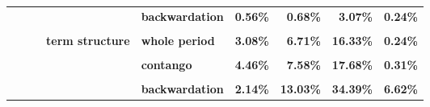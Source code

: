 \documentclass[
  authoryear,
  preprint,
  3p]{elsarticle}
\begin{document}
\begin{landscape}
\begin{longtable}[t]{>{}l>{}l>{}l>{}l>{}l>{}r>{}r>{}r>{}r}
\textbf{} & \textbf{} & \textbf{} & \textbf{} & \textbf{backwardation} & \textcolor[HTML]{4285f4}{\textbf{0.56\%}} & \textcolor[HTML]{4285f4}{\textbf{0.68\%}} & \textcolor[HTML]{4285f4}{\textbf{3.07\%}} & \textcolor[HTML]{4285f4}{\textbf{0.24\%}}\\
\addlinespace
\textbf{\cellcolor{gray!10}{}} & \textbf{\cellcolor{gray!10}{}} & \textbf{\cellcolor{gray!10}{}} & \textbf{\cellcolor{gray!10}{}} & \textbf{\cellcolor{gray!10}{contango}} & \textcolor[HTML]{4285f4}{\textbf{\cellcolor{gray!10}{0.71\%}}} & \textcolor[HTML]{4285f4}{\textbf{\cellcolor{gray!10}{1.15\%}}} & \textcolor[HTML]{4285f4}{\textbf{\cellcolor{gray!10}{4.53\%}}} & \textcolor[HTML]{4285f4}{\textbf{\cellcolor{gray!10}{0.21\%}}}\\
\textbf{} & \textbf{} & \textbf{} & \textbf{term structure} & \textbf{whole period} & \textcolor[HTML]{4285f4}{\textbf{3.08\%}} & \textcolor[HTML]{4285f4}{\textbf{6.71\%}} & \textcolor[HTML]{4285f4}{\textbf{16.33\%}} & \textcolor[HTML]{4285f4}{\textbf{0.24\%}}\\
\textbf{\cellcolor{gray!10}{}} & \textbf{\cellcolor{gray!10}{}} & \textbf{\cellcolor{gray!10}{}} & \textbf{\cellcolor{gray!10}{}} & \textbf{\cellcolor{gray!10}{backwardation}} & \textcolor[HTML]{4285f4}{\textbf{\cellcolor{gray!10}{1.79\%}}} & \textcolor[HTML]{4285f4}{\textbf{\cellcolor{gray!10}{6.21\%}}} & \textcolor[HTML]{4285f4}{\textbf{\cellcolor{gray!10}{14.69\%}}} & \textcolor[HTML]{4285f4}{\textbf{\cellcolor{gray!10}{0.39\%}}}\\
\textbf{} & \textbf{} & \textbf{} & \textbf{} & \textbf{contango} & \textcolor[HTML]{4285f4}{\textbf{4.46\%}} & \textcolor[HTML]{4285f4}{\textbf{7.58\%}} & \textcolor[HTML]{4285f4}{\textbf{17.68\%}} & \textcolor[HTML]{4285f4}{\textbf{0.31\%}}\\
\textbf{\cellcolor{gray!10}{GB}} & \textbf{\cellcolor{gray!10}{all}} & \textbf{\cellcolor{gray!10}{all}} & \textbf{\cellcolor{gray!10}{market}} & \textbf{\cellcolor{gray!10}{whole period}} & \textcolor[HTML]{4285f4}{\textbf{\cellcolor{gray!10}{1.74\%}}} & \textcolor[HTML]{4285f4}{\textbf{\cellcolor{gray!10}{11.71\%}}} & \textcolor[HTML]{4285f4}{\textbf{\cellcolor{gray!10}{33.71\%}}} & \textcolor[HTML]{4285f4}{\textbf{\cellcolor{gray!10}{10.75\%}}}\\
\addlinespace
\textbf{} & \textbf{} & \textbf{} & \textbf{} & \textbf{backwardation} & \textcolor[HTML]{4285f4}{\textbf{2.14\%}} & \textcolor[HTML]{4285f4}{\textbf{13.03\%}} & \textcolor[HTML]{4285f4}{\textbf{34.39\%}} & \textcolor[HTML]{4285f4}{\textbf{6.62\%}}\\

\end{longtable}
\end{landscape}
\end{document}
